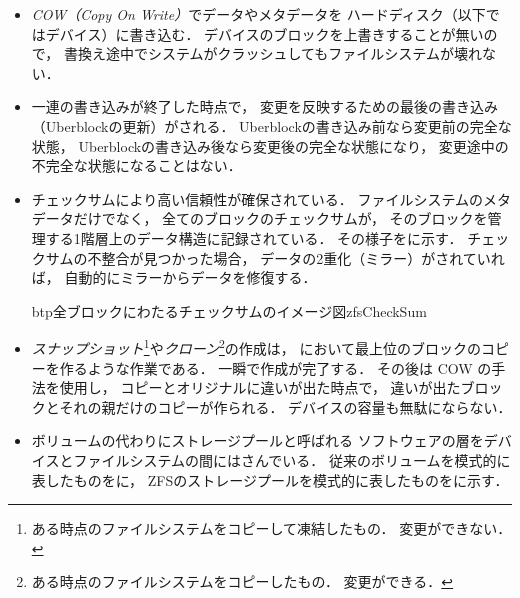 \begin{itemize}
\item \emph{COW（Copy On Write）}でデータやメタデータを
  ハードディスク（以下ではデバイス）に書き込む．
  デバイスのブロックを上書きすることが無いので，
  書換え途中でシステムがクラッシュしてもファイルシステムが壊れない．
\item 一連の書き込みが終了した時点で，
  変更を反映するための最後の書き込み（Uberblockの更新）がされる．
  Uberblockの書き込み前なら変更前の完全な状態，
  Uberblockの書き込み後なら変更後の完全な状態になり，
  変更途中の不完全な状態になることはない．
\item チェックサムにより高い信頼性が確保されている．
  ファイルシステムのメタデータだけでなく，
  全てのブロックのチェックサムが，
  そのブロックを管理する1階層上のデータ構造に記録されている．
  その様子をに示す．
  チェックサムの不整合が見つかった場合，
  データの2重化（ミラー）がされていれば，
  自動的にミラーからデータを修復する．

  \begin{myfig}{btp}{全ブロックにわたるチェックサムのイメージ図}{zfsCheckSum}
  \end{myfig}

\item \emph{スナップショット}\footnote{
    ある時点のファイルシステムをコピーして凍結したもの．
    変更ができない．
  }や\emph{クローン}\footnote{
    ある時点のファイルシステムをコピーしたもの．
    変更ができる．
  }の作成は，
  において最上位のブロックのコピーを作るような作業である．
  一瞬で作成が完了する．
  その後は COW の手法を使用し，
  コピーとオリジナルに違いが出た時点で，
  違いが出たブロックとそれの親だけのコピーが作られる．
  デバイスの容量も無駄にならない．

\item ボリュームの代わりにストレージプールと呼ばれる
  ソフトウェアの層をデバイスとファイルシステムの間にはさんでいる．
  従来のボリュームを模式的に表したものをに，
  ZFSのストレージプールを模式的に表したものをに示す．


\end{itemize}
